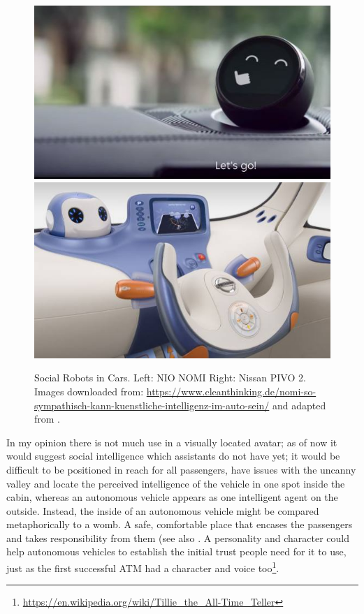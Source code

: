 \begin{figure}
    \includegraphics[height=0.28\textwidth]{fig/NOMI}\hfill\includegraphics[height=0.28\textwidth]{fig/PIVO}
    \caption[Social Robots in Cars]{Social Robots in Cars. Left: NIO NOMI 
   Right: Nissan PIVO 2. Images downloaded from: \url{https://www.cleanthinking.de/nomi-so-sympathisch-kann-kuenstliche-intelligenz-im-auto-sein/} and adapted from \cite{Perchonok2009FacilitatingLiterature}.}
    \label{fig:robots}
\end{figure}
In my opinion there is not much use in a visually located  avatar; as of now it would suggest social intelligence which assistants do not have yet; it would be difficult to be positioned in reach for all passengers, have issues with the uncanny valley and locate the perceived intelligence of the vehicle in one spot inside the cabin, whereas an autonomous vehicle appears as one intelligent agent on the outside. Instead, the inside of an autonomous vehicle might be compared metaphorically to a womb. A safe, comfortable place that encases the passengers and takes responsibility from them (see also . A personality and character could help autonomous vehicles to establish the initial trust people need for it to use, just as the first successful ATM had a character and voice too\footnote{\url{https://en.wikipedia.org/wiki/Tillie_the_All-Time_Teller}}.


